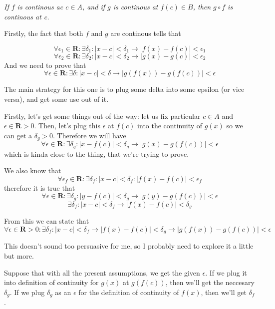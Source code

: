\documentclass[11pt,oneside,titlepage]{book}
\begin{document}
\textit{If $f$ is continous ac $c \in A$, and if $g$ is continous at
  $f(c) \in B$, then $g \circ f$ is continous at c.}

Firstly, the fact that both $f$ and $g$ are continous tells that

$$\forall \epsilon_1 \in \textbf{R}: \exists \delta_1:  |x - c| < \delta_1 \to
|f(x) - f(c)| < \epsilon_1$$
$$\forall \epsilon_2 \in \textbf{R}: \exists \delta_2: |x - c| < \delta_2 \to
|g(x) - g (c)| < \epsilon_2$$
And we need to prove that
$$\forall \epsilon \in \textbf{R}: \exists \delta: |x - c| < \delta \to
|g(f(x)) - g (f(c))| < \epsilon$$


The main strategy for this one is to plug some delta into some epsilon (or
vice versa), and get some use out of it.

Firstly, let's get some things out of the way: let us fix particular $c \in A$
and $\epsilon \in \textbf{R} > 0$. Then, let's plug this $\epsilon$ at $f(c)$
into the continuity of $g(x)$ so we can get a $\delta_g > 0$. Therefore
we will have
$$ \forall \epsilon \in \textbf{R}: \exists \delta_g: |x - f(c)| < \delta_g
\to |g(x) - g(f(c))| < \epsilon $$
which is kinda close to the thing, that we're trying to prove.

We also know that
$$ \forall \epsilon_f \in \textbf{R}: \exists \delta_f: |x - c | < \delta_f:
|f(x) - f(c)| < \epsilon_f$$
therefore it is true that
$$ \forall \epsilon \in \textbf{R}: \exists \delta_g: |y - f(c)| < \delta_g
\to |g(y) - g(f(c))| < \epsilon $$
$$ \exists \delta_f: |x - c | < \delta_f \to
|f(x) - f(c)| < \delta_g$$

From this we can state that
$$ \forall \epsilon \in \textbf{R} > 0: \exists \delta_f: |x - c | < \delta_f \to |f(x) - f(c)| < \delta_g \to
|g(f(x)) - g(f(c))| < \epsilon $$

This doesn't sound too persuasive for me, so I probably need to explore it a
little but more.

Suppose that with all the present assumptions, we get the given $\epsilon$.
If we plug it into definition of continuity for  $g(x)$ at $g(f(c))$, then
we'll get the neccesary $\delta_g$. If we plug $\delta_g$ as an $\epsilon$
for the definition of continuity of $f(x)$, then we'll get $\delta_f$.
\end{document}
